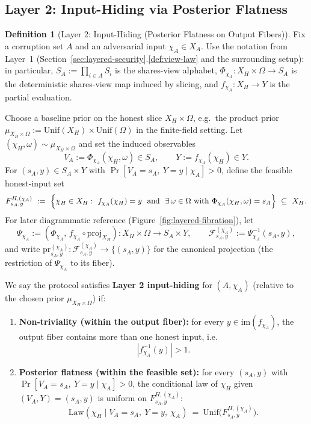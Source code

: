 \documentclass[11pt,a4paper]{article}
\theoremstyle{definition}
\newtheorem{definition}{Definition}[section]
\theoremstyle{plain}
\newcommand{\cF}{\mathcal{F}}
\begin{document}
\subsection{Layer 2: Input-Hiding via Posterior Flatness}
\begin{definition}[Layer 2: Input-Hiding (Posterior Flatness on Output Fibers)]
\label{def:layer2}
Fix a corruption set $A$ and an adversarial input $\chi_A\in X_A$.
Use the notation from Layer~1 (Section~\ref{sec:layered-security}.\ref{def:view-law} and the surrounding setup): in particular,
$S_A:=\prod_{i\in A}S_i$ is the shares-view alphabet, $\Phi_{\chi_A}:X_H\times\Omega\to S_A$ is the deterministic shares-view map induced by slicing,
and $f_{\chi_A}:X_H\to Y$ is the partial evaluation.

\smallskip
\noindent Choose a baseline prior on the honest slice $X_H\times \Omega$, e.g.\ the product prior
$\mu_{X_H\times \Omega}:=\mathrm{Unif}(X_H)\times \mathrm{Unif}(\Omega)$ in the finite-field setting.
Let $(\chi_H,\omega)\sim \mu_{X_H\times \Omega}$ and set the induced observables
\[
V_A:=\Phi_{\chi_A}(\chi_H,\omega)\in S_A,\qquad Y:=f_{\chi_A}(\chi_H)\in Y.
\]
For $(s_A,y)\in S_A\times Y$ with $\Pr[V_A=s_A,\ Y=y \mid \chi_A]>0$, define the feasible honest-input set
\[
F^{H,(\chi_A)}_{s_A,y}\ :=\ \Bigl\{\chi_H\in X_H:\ f_{\chi_A}(\chi_H)=y\ \text{ and }\ \exists\,\omega\in\Omega\ \text{with}\ \Phi_{\chi_A}(\chi_H,\omega)=s_A\Bigr\}\ \subseteq\ X_H.
\]
\noindent For later diagrammatic reference (Figure~\ref{fig:layered-fibration}), let
\[
\Psi_{\chi_A}:=(\Phi_{\chi_A},\, f_{\chi_A}\circ \mathrm{proj}_{X_H}):X_H\times\Omega\to S_A\times Y,
\qquad
\cF^{(\chi_A)}_{s_A,y}:=\Psi_{\chi_A}^{-1}(s_A,y),
\]
and write $\mathrm{pr}^{(\chi_A)}_{s_A,y}:\cF^{(\chi_A)}_{s_A,y}\to\{(s_A,y)\}$ for the canonical projection (the restriction of $\Psi_{\chi_A}$ to its fiber).

We say the protocol satisfies \textbf{Layer 2 input-hiding} for $(A,\chi_A)$ (relative to the chosen prior $\mu_{X_H\times\Omega}$) if:
\begin{enumerate}
    \item \textbf{Non-triviality (within the output fiber):}
    for every $y\in \mathrm{im}(f_{\chi_A})$, the output fiber contains more than one honest input, i.e.
    \[
    |f_{\chi_A}^{-1}(y)|>1.
    \]
    \item \textbf{Posterior flatness (within the feasible set):}
    for every $(s_A,y)$ with $\Pr[V_A=s_A,\ Y=y \mid \chi_A]>0$, the conditional law of $\chi_H$ given $(V_A,Y)=(s_A,y)$ is uniform on $F^{H,(\chi_A)}_{s_A,y}$:
    \[
    \mathrm{Law}(\chi_H\mid V_A=s_A,\ Y=y,\ \chi_A)\ =\ \mathrm{Unif}\!\bigl(F^{H,(\chi_A)}_{s_A,y}\bigr).
    \]
\end{enumerate}
\end{definition}
\end{document}
